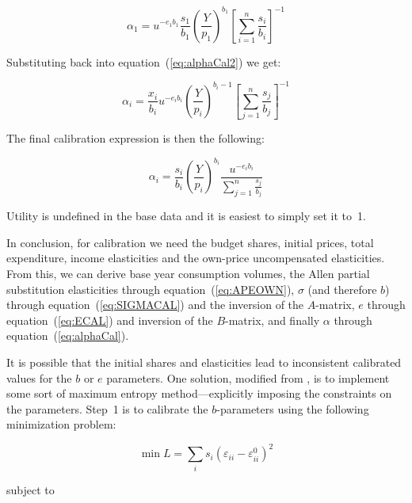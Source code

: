 \begin{equation}
{\alpha_1} = {u^{ - {e_1}{b_1}}}\frac{{{s_1}}}{{{b_1}}}
{\left( {\frac{Y}{{{p_1}}}} \right)^{{b_1}}}
{\left[ {\sum\limits_{i = 1}^n {\frac{{{s_i}}}{{{b_i}}}} } \right]^{ - 1}}
\end{equation}

\noindent Substituting back into equation~(\ref{eq:alphaCal2}) we get:

\begin{equation}
{\alpha_i} = \frac{{{x_i}}}{{{b_i}}}{u^{ - {e_i}{b_i}}}
{\left( {\frac{Y}{{{p_i}}}} \right)^{{b_i} - 1}}{\left[ {\sum\limits_{j = 1}^n
{\frac{{{s_j}}}{{{b_j}}}} } \right]^{ - 1}}
\end{equation}

\noindent The final calibration expression is then the following:

\begin{equation}
\label{eq:alphaCal}
{\alpha_i} = \frac{{{s_i}}}{{{b_i}}}{\left( {\frac{Y}{{{p_i}}}} \right)^{{b_i}}}
\frac{{{u^{ - {e_i}{b_i}}}}}{{\sum\limits_{j = 1}^n {\frac{{{s_j}}}{{{b_j}}}} }}
\end{equation}

Utility is undefined in the base data and it is easiest to simply set it to~1.

In conclusion, for calibration we need the budget shares, initial prices, total expenditure,
income elasticities and the own-price uncompensated elasticities. From this, we can derive
base year consumption volumes, the Allen partial substitution elasticities through
equation~(\ref{eq:APEOWN}), $\sigma$ (and therefore $b$) through equation~(\ref{eq:SIGMACAL})
and the inversion of the $A$-matrix, $e$ through equation~(\ref{eq:ECAL}) and inversion of the
$B$-matrix, and finally $\alpha$ through equation~(\ref{eq:alphaCal}).

It is possible that the initial shares and elasticities lead to inconsistent calibrated values
for the $b$ or $e$ parameters. One solution, modified from \cite{Hertel1997}, is to implement some
sort of maximum entropy method---explicitly imposing the constraints on the parameters. Step~1
is to calibrate the $b$-parameters using the following minimization problem:

\begin{displaymath}
\min L = \sum\limits_i {{s_i}{{({\varepsilon_{ii}} - \varepsilon_{ii}^0)}^2}}
\end{displaymath}

\noindent subject to

